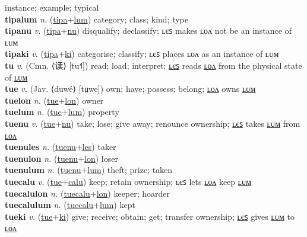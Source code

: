 instance; example; typical \label{tipalon} \\
\textbf{tipalum} \textit{n.} (\hyperref[tipa]{tipa}+\hyperref[lum]{lum})
category; class; kind; type \label{tipalum} \\
\textbf{tipanu} \textit{v.} (\hyperref[tipa]{tipa}+\hyperref[nu]{nu})
disqualify; declassify; ʟєꜱ makes ʟᴏᴧ not be an instance of ʟᴜᴍ \label{tipanu} \\
\textbf{tipaki} \textit{v.} (\hyperref[tipa]{tipa}+\hyperref[ki]{ki})
categorise; classify; ʟєꜱ places ʟᴏᴧ as an instance of ʟᴜᴍ \label{tipaki} \\
\textbf{tu} \textit{v.} (Cmn. ⟨读⟩ [tu˧˥])
read; load; interpret; \hyperref[tules]{ʟєꜱ} reads \hyperref[tulon]{ʟᴏᴧ} from the physical state of \hyperref[tulum]{ʟᴜᴍ} \label{tu} \\
\textbf{tue} \textit{v.} (Jav. ⟨duwé⟩ [tṳwe])
own; have; possess; belong; \hyperref[tuelon]{ʟᴏᴧ} owns \hyperref[tuelum]{ʟᴜᴍ} \label{tue} \\
\textbf{tuelon} \textit{n.} (\hyperref[tue]{tue}+\hyperref[lon]{lon})
owner \label{tuelon} \\
\textbf{tuelum} \textit{n.} (\hyperref[tue]{tue}+\hyperref[lum]{lum})
property \label{tuelum} \\
\textbf{tuenu} \textit{v.} (\hyperref[tue]{tue}+\hyperref[nu]{nu})
take; lose; give away; renounce ownership; \hyperref[tuenules]{ʟєꜱ} takes \hyperref[tuenulum]{ʟᴜᴍ} from \hyperref[tuenulon]{ʟᴏᴧ} \label{tuenu} \\
\textbf{tuenules} \textit{n.} (\hyperref[tuenu]{tuenu}+\hyperref[les]{les})
taker \label{tuenules} \\
\textbf{tuenulon} \textit{n.} (\hyperref[tuenu]{tuenu}+\hyperref[lon]{lon})
loser \label{tuenulon} \\
\textbf{tuenulum} \textit{n.} (\hyperref[tuenu]{tuenu}+\hyperref[lum]{lum})
theft; prize; taken \label{tuenulum} \\
\textbf{tuecalu} \textit{v.} (\hyperref[tue]{tue}+\hyperref[calu]{calu})
keep; retain ownership; ʟєꜱ lets \hyperref[tuecalulon]{ʟᴏᴧ} keep \hyperref[tuecalulum]{ʟᴜᴍ} \label{tuecalu} \\
\textbf{tuecalulon} \textit{n.} (\hyperref[tuecalu]{tuecalu}+\hyperref[lon]{lon})
keeper; hoarder \label{tuecalulon} \\
\textbf{tuecalulum} \textit{n.} (\hyperref[tuecalu]{tuecalu}+\hyperref[lum]{lum})
kept \label{tuecalulum} \\
\textbf{tueki} \textit{v.} (\hyperref[tue]{tue}+\hyperref[ki]{ki})
give; receive; obtain; get; transfer ownership; \hyperref[tuekiles]{ʟєꜱ} gives \hyperref[tuekilum]{ʟᴜᴍ} to \hyperref[tuekilon]{ʟᴏᴧ} \label{tueki} \\
